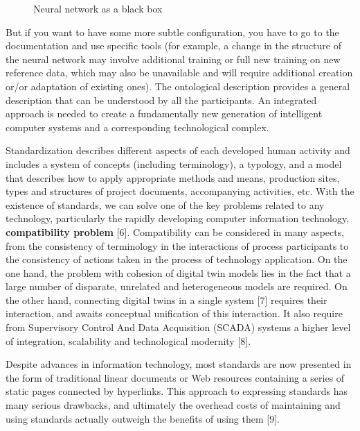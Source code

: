 \documentclass[10pt, a4paper]{proc}
\begin{document}
{\begin{figure}
{
\caption{Neural network as a black box
} \label{fig:M1}}
\end{figure}

\par But if you want to have some more subtle configuration, you have to go to the documentation and use
specific tools (for example, a change in the structure
of the neural network may involve additional training or
full new training on new reference data, which may also
be unavailable and will require additional creation or/or
adaptation of existing ones). The ontological description
provides a general description that can be understood by
all the participants. An integrated approach is needed
to create a fundamentally new generation of intelligent
computer systems and a corresponding technological
complex.
\par Standardization describes different aspects of each developed human activity and includes a system of concepts
(including terminology), a typology, and a model that
describes how to apply appropriate methods and means,
production sites, types and structures of project documents, accompanying activities, etc. With the existence
of standards, we can solve one of the key problems
related to any technology, particularly the rapidly developing computer information technology, \textbf{compatibility
problem} [6]. Compatibility can be considered in many
aspects, from the consistency of terminology in the
interactions of process participants to the consistency
of actions taken in the process of technology application. On the one hand, the problem with cohesion of
digital twin models lies in the fact that a large number
of disparate, unrelated and heterogeneous models are
required. On the other hand, connecting digital twins
in a single system [7] requires their interaction, and
awaits conceptual unification of this interaction. It also
require from Supervisory Control And Data Acquisition
(SCADA) systems a higher level of integration, scalability and technological modernity [8].
\par Despite advances in information technology, most
standards are now presented in the form of traditional
linear documents or Web resources containing a series of static pages connected by hyperlinks. This approach
to expressing standards has many serious drawbacks,
and ultimately the overhead costs of maintaining and
using standards actually outweigh the benefits of using
them [9].

}
\end{document}
